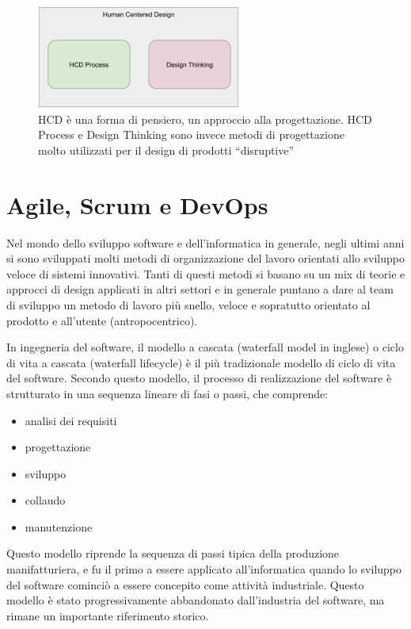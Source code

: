 \begin{figure}
	\centering
	\includegraphics[width=0.6\textwidth]{immagini/dtvshcdp}
	\caption{HCD è una forma di pensiero, un approccio alla progettazione. HCD Process e Design Thinking sono invece metodi di progettazione molto utilizzati per il design di prodotti “disruptive”
}
\end{figure}

\section{Agile, Scrum e DevOps}
Nel mondo dello sviluppo software e dell'informatica in generale, negli ultimi anni si sono sviluppati molti metodi di organizzazione del lavoro orientati allo sviluppo veloce di sistemi innovativi. Tanti di questi metodi si basano su un mix di teorie e approcci di design applicati in altri settori e in generale puntano a dare al team di sviluppo un metodo di lavoro più snello, veloce e sopratutto orientato al prodotto e all'utente (antropocentrico).


In ingegneria del software, il modello a cascata (waterfall model in inglese) o ciclo di vita a cascata (waterfall lifecycle) è il più tradizionale modello di ciclo di vita del software. Secondo questo modello, il processo di realizzazione del software è strutturato in una sequenza lineare di fasi o passi, che comprende:

\begin{itemize}
    \item analisi dei requisiti
    \item progettazione
    \item sviluppo
    \item collaudo
    \item manutenzione

\end{itemize}

Questo modello riprende la sequenza di passi tipica della produzione manifatturiera, e fu il primo a essere applicato all'informatica quando lo sviluppo del software cominciò a essere concepito come attività industriale. Questo modello è stato progressivamente abbandonato dall'industria del software, ma rimane un importante riferimento storico.

